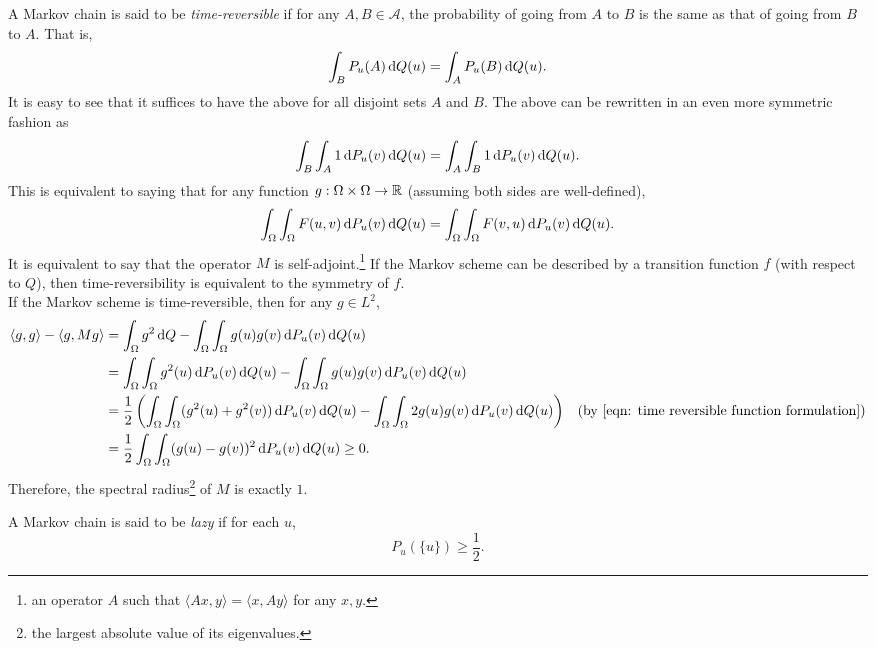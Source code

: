A Markov chain is said to be \textit{time-reversible} if for any $A,B\in\mathcal{A}$, the probability of going from $A$ to $B$ is the same as that of going from $B$ to $A$. That is,
\[ \int_B P_u(A)\operatorname{d}\!{Q}(u) = \int_A P_u(B) \operatorname{d}\!{Q}(u). \]
It is easy to see that it suffices to have the above for all disjoint sets $A$ and $B$. The above can be rewritten in an even more symmetric fashion as
\[ \int_B \int_A 1\operatorname{d}\!{P}_u(v)\operatorname{d}\!{Q}(u) = \int_A \int_B 1\operatorname{d}\!{P}_u(v)\operatorname{d}\!{Q}(u). \]
This is equivalent to saying that for any function $g:\Omega\times\Omega\to\mathbb{R}$ (assuming both sides are well-defined),
\begin{equation}
\label{eqn: time reversible function formulation}
    \int_\Omega \int_\Omega F(u,v)\operatorname{d}\!{P}_u(v)\operatorname{d}\!{Q}(u) = \int_\Omega \int_\Omega F(v,u)\operatorname{d}\!{P}_u(v)\operatorname{d}\!{Q}(u).
\end{equation}
It is equivalent to say that the operator $M$ is self-adjoint.\footnote{an operator $A$ such that $\langle Ax,y\rangle=\langle x,A y\rangle$ for any $x,y$.} If the Markov scheme can be described by a transition function $f$ (with respect to $Q$), then time-reversibility is equivalent to the symmetry of $f$.\\
If the Markov scheme is time-reversible, then for any $g\in L^2$,
\begin{align}
    \langle g,g\rangle - \langle g,M g\rangle &= \int_{\Omega} g^2\d{Q} - \int_\Omega\int_\Omega g(u)g(v)\d{P_u}(v)\d{Q}(u) \nonumber \\
    &= \int_{\Omega}\int_\Omega g^2(u)\d{P_u}(v)\d{Q}(u) - \int_\Omega\int_\Omega g(u)g(v)\d{P_u}(v)\d{Q}(u) \nonumber \\
    &= \frac{1}{2} \left(\int_{\Omega}\int_\Omega (g^2(u)+g^2(v))\d{P_u}(v)\d{Q}(u) - \int_\Omega\int_\Omega 2g(u)g(v)\d{P_u}(v)\d{Q}(u)\right) & (\text{by \Cref{eqn: time reversible function formulation}}) \nonumber \\
    &= \frac{1}{2}\int_\Omega\int_\Omega (g(u)-g(v))^2\d{P_u}(v)\d{Q}(u) \geq 0. \label{eqn: self-adjoint spectral radius 1}
\end{align}
Therefore, the spectral radius\footnote{the largest absolute value of its eigenvalues.} of $M$ is exactly $1$.

\begin{definition}[Laziness]
A Markov chain is said to be \textit{lazy} if for each $u$,
\[ P_u(\{u\})\geq\frac{1}{2}. \]
\end{definition}

